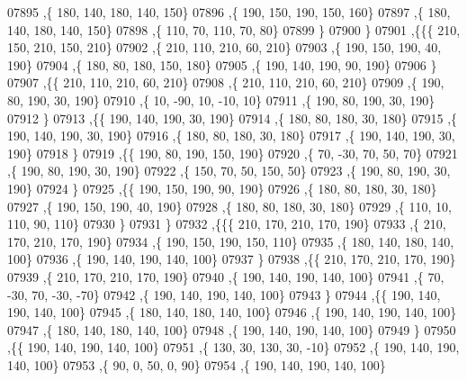 \begin{DoxyCode}
07895     ,\{   180,   140,   180,   140,   150\}
07896     ,\{   190,   150,   190,   150,   160\}
07897     ,\{   180,   140,   180,   140,   150\}
07898     ,\{   110,    70,   110,    70,    80\}
07899     \}
07900    \}
07901   ,\{\{\{   210,   150,   210,   150,   210\}
07902     ,\{   210,   110,   210,    60,   210\}
07903     ,\{   190,   150,   190,    40,   190\}
07904     ,\{   180,    80,   180,   150,   180\}
07905     ,\{   190,   140,   190,    90,   190\}
07906     \}
07907    ,\{\{   210,   110,   210,    60,   210\}
07908     ,\{   210,   110,   210,    60,   210\}
07909     ,\{   190,    80,   190,    30,   190\}
07910     ,\{    10,   -90,    10,   -10,    10\}
07911     ,\{   190,    80,   190,    30,   190\}
07912     \}
07913    ,\{\{   190,   140,   190,    30,   190\}
07914     ,\{   180,    80,   180,    30,   180\}
07915     ,\{   190,   140,   190,    30,   190\}
07916     ,\{   180,    80,   180,    30,   180\}
07917     ,\{   190,   140,   190,    30,   190\}
07918     \}
07919    ,\{\{   190,    80,   190,   150,   190\}
07920     ,\{    70,   -30,    70,    50,    70\}
07921     ,\{   190,    80,   190,    30,   190\}
07922     ,\{   150,    70,    50,   150,    50\}
07923     ,\{   190,    80,   190,    30,   190\}
07924     \}
07925    ,\{\{   190,   150,   190,    90,   190\}
07926     ,\{   180,    80,   180,    30,   180\}
07927     ,\{   190,   150,   190,    40,   190\}
07928     ,\{   180,    80,   180,    30,   180\}
07929     ,\{   110,    10,   110,    90,   110\}
07930     \}
07931    \}
07932   ,\{\{\{   210,   170,   210,   170,   190\}
07933     ,\{   210,   170,   210,   170,   190\}
07934     ,\{   190,   150,   190,   150,   110\}
07935     ,\{   180,   140,   180,   140,   100\}
07936     ,\{   190,   140,   190,   140,   100\}
07937     \}
07938    ,\{\{   210,   170,   210,   170,   190\}
07939     ,\{   210,   170,   210,   170,   190\}
07940     ,\{   190,   140,   190,   140,   100\}
07941     ,\{    70,   -30,    70,   -30,   -70\}
07942     ,\{   190,   140,   190,   140,   100\}
07943     \}
07944    ,\{\{   190,   140,   190,   140,   100\}
07945     ,\{   180,   140,   180,   140,   100\}
07946     ,\{   190,   140,   190,   140,   100\}
07947     ,\{   180,   140,   180,   140,   100\}
07948     ,\{   190,   140,   190,   140,   100\}
07949     \}
07950    ,\{\{   190,   140,   190,   140,   100\}
07951     ,\{   130,    30,   130,    30,   -10\}
07952     ,\{   190,   140,   190,   140,   100\}
07953     ,\{    90,     0,    50,     0,    90\}
07954     ,\{   190,   140,   190,   140,   100\}

\end{DoxyCode}
